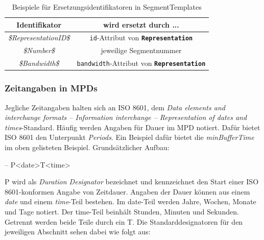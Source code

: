 \documentclass[paper = a4, fontsize = 12pt, parskip = half]{scrartcl} %
\def\attr#1{\texttt{#1}}
\def\elem#1{\texttt{\textbf{#1}}}
\begin{document}
\begin{center}
	\begin{table}[ht]
        \centering
		\label{template_substitutions}
		\begin{tabular}{| c | c |}
			\hline
			\textbf{Identifikator}        & \textbf{wird ersetzt durch ...}                     \\
			\hline
			\hline
			\textit{\$RepresentationID\$} & \attr{id}-Attribut von \elem{Representation}        \\
			\hline
			\textit{\$Number\$}           & jeweilige Segmentnummer                             \\
			\hline
			\textit{\$Bandwidth\$}        & \attr{bandwidth}-Attribut von \elem{Representation} \\
			\hline
		\end{tabular}
        \caption{Beispiele für Ersetzungsidentifikatoren in SegmentTemplates}
	\end{table}
\end{center}


\subsubsection{Zeitangaben in MPDs}
\label{iso8601_duration}
Jegliche Zeitangaben halten sich an ISO 8601, dem \textit{Data elements and interchange formats – Information interchange – Representation of dates and times}-Standard. Häufig werden Angaben für Dauer im MPD notiert. Dafür bietet ISO 8601 den Unterpunkt \textit{Periods}. Ein Beispiel dafür bietet die \textit{minBufferTime} im oben gelisteten Beispiel. Grundsätzlicher Aufbau:

-- P<date>T<time>

P wird als \textit{Duration Designator} bezeichnet und kennzeichnet den Start einer ISO 8601-konformen Angabe von Zeitdauer. Angaben der Dauer können aus einem \textit{date} und einem \textit{time}-Teil bestehen. Im date-Teil werden Jahre, Wochen, Monate und Tage notiert. Der time-Teil beinhält Stunden, Minuten und Sekunden. Getrennt werden beide Teile durch ein T. Die Standarddesignatoren für den jeweiligen Abschnitt sehen dabei wie folgt aus:
\end{document}
